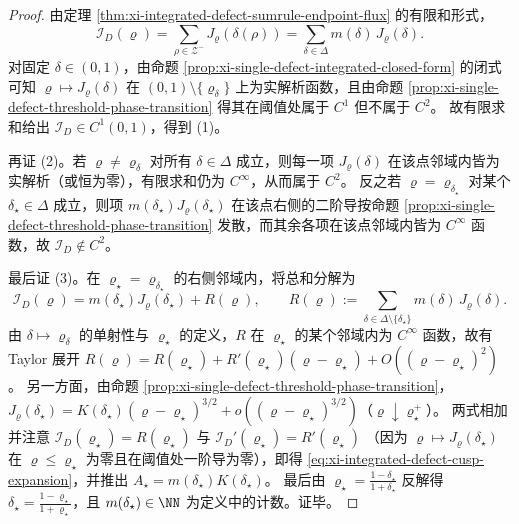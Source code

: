 \begin{proof}
由定理 \ref{thm:xi-integrated-defect-sumrule-endpoint-flux} 的有限和形式，
\[
\mathcal{I}_D(\varrho)=\sum_{\rho\in\mathcal{Z}^-}J_{\varrho}(\delta(\rho))
=\sum_{\delta\in\Delta} m(\delta)\,J_{\varrho}(\delta).
\]
对固定 \(\delta\in(0,1)\)，由命题 \ref{prop:xi-single-defect-integrated-closed-form} 的闭式可知
\(\varrho\mapsto J_{\varrho}(\delta)\)
在 \((0,1)\setminus\{\varrho_\delta\}\) 上为实解析函数，且由命题 \ref{prop:xi-single-defect-threshold-phase-transition} 得其在阈值处属于 \(C^1\) 但不属于 \(C^2\)。
故有限求和给出 \(\mathcal{I}_D\in C^1(0,1)\)，得到 (1)。
\par
再证 (2)。若 \(\varrho\neq \varrho_\delta\) 对所有 \(\delta\in\Delta\) 成立，则每一项 \(J_{\varrho}(\delta)\) 在该点邻域内皆为实解析（或恒为零），有限求和仍为 \(C^\infty\)，从而属于 \(C^2\)。
反之若 \(\varrho=\varrho_{\delta_\star}\) 对某个 \(\delta_\star\in\Delta\) 成立，则项 \(m(\delta_\star)J_{\varrho}(\delta_\star)\) 在该点右侧的二阶导按命题 \ref{prop:xi-single-defect-threshold-phase-transition} 发散，而其余各项在该点邻域内皆为 \(C^\infty\) 函数，故 \(\mathcal{I}_D\notin C^2\)。
\par
最后证 (3)。在 \(\varrho_\star=\varrho_{\delta_\star}\) 的右侧邻域内，将总和分解为
\[
\mathcal{I}_D(\varrho)
=m(\delta_\star)J_{\varrho}(\delta_\star)+R(\varrho),
\qquad
R(\varrho):=\sum_{\delta\in\Delta\setminus\{\delta_\star\}} m(\delta)\,J_{\varrho}(\delta).
\]
由 \(\delta\mapsto \varrho_\delta\) 的单射性与 \(\varrho_\star\) 的定义，\(R\) 在 \(\varrho_\star\) 的某个邻域内为 \(C^\infty\) 函数，故有 Taylor 展开
\(
R(\varrho)=R(\varrho_\star)+R'(\varrho_\star)(\varrho-\varrho_\star)+O((\varrho-\varrho_\star)^2)
\)。
另一方面，由命题 \ref{prop:xi-single-defect-threshold-phase-transition}，
\(
J_{\varrho}(\delta_\star)
=K(\delta_\star)(\varrho-\varrho_\star)^{3/2}+o((\varrho-\varrho_\star)^{3/2})
\)（\(\varrho\downarrow \varrho_\star^+\)）。
两式相加并注意
\(
\mathcal{I}_D(\varrho_\star)=R(\varrho_\star)
\)
与
\(
\mathcal{I}_D'(\varrho_\star)=R'(\varrho_\star)
\)
（因为 \(\varrho\mapsto J_{\varrho}(\delta_\star)\) 在 \(\varrho\le \varrho_\star\) 为零且在阈值处一阶导为零），即得 \eqref{eq:xi-integrated-defect-cusp-expansion}，并推出 \(A_\star=m(\delta_\star)K(\delta_\star)\)。
最后由 \(\varrho_\star=\frac{1-\delta_\star}{1+\delta_\star}\) 反解得 \(\delta_\star=\frac{1-\varrho_\star}{1+\varrho_\star}\)，且 \(m(\delta_\star)\in\NN\) 为定义中的计数。证毕。
\end{proof}

\endinput

